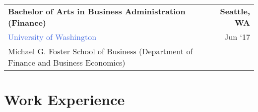 \documentclass[10pt]{article}
\newcommand{\highlightcolor}{RoyalBlue}
\newcommand{\tabularxwidth}{\textwidth}
\begin{document}
        
            \vspace{.3em}
        

    
        \begin{tabularx}{\tabularxwidth}{X r}
            \textbf{Bachelor of Arts in Business Administration (Finance)} & \textbf{
    Seattle, 
        WA} \\
            \quad \textcolor{\highlightcolor}{University of Washington} & 
    Jun ‘17 \\
            \quad Michael G. Foster School of Business (Department of Finance and Business Economics) & \\
            
        \end{tabularx}

        

    

    \vspace{-0.5em}


    
        \section{Work Experience}
        \vspace{-.5em}
\end{document}
